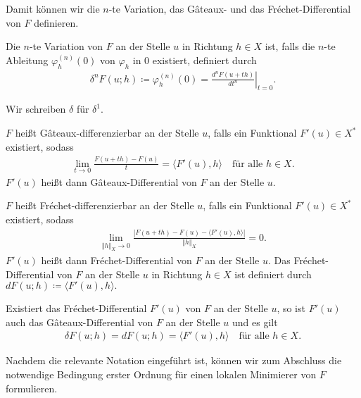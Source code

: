 Damit können wir die $n$-te Variation, das G\^ateaux- und das 
Fr\'echet-Differential von $F$ definieren.

\begin{definition}[$n$-te Variation]
  Die $n$-te Variation von $F$ an der Stelle $u$ in Richtung $h\in X$ ist,
  falls die $n$-te Ableitung $\varphi_h^{(n)}(0)$ von $\varphi_h$ in $0$
  existiert, definiert durch 
  \begin{align*}
    \delta^n F(u;h)\coloneqq \varphi_h^{(n)}(0)=
    \left. \frac{d^n F(u+th)}{dt^n}\right|_{t=0}.
  \end{align*}

  Wir schreiben $\delta$ für $\delta^1$.
\end{definition}

\begin{definition}
  $F$ heißt G\^ateaux-differenzierbar an der Stelle $u$, falls ein 
  Funktional $F'(u)\in X^\ast$ existiert, sodass
  \begin{align*}
    \lim_{t\to 0}\frac{F(u+th)-F(u)}{t} = \langle F'(u), h\rangle\quad
    \text{für alle } h\in X.
  \end{align*}
  $F'(u)$ heißt dann G\^ateaux-Differential von $F$ an der Stelle $u$.

  $F$ heißt Fr\'echet-differenzierbar an der Stelle $u$, falls ein Funktional
  $F'(u)\in X^\ast$ existiert, sodass
  \begin{align*}
    \lim_{\Vert h\Vert_X\to 0}\frac{|F(u+th)-F(u)-
    \langle F'(u),h\rangle|}{\Vert h\Vert_X} =0.
  \end{align*}
  $F'(u)$ heißt dann Fr\'echet-Differential von $F$ an der Stelle $u$.
  Das Fr\'echet-Differential von $F$ an der Stelle $u$ in Richtung $h\in X$
  ist definiert durch $dF(u;h)\coloneqq \langle F'(u),h\rangle.$
\end{definition}

\begin{remark}
  Existiert das Fr\'echet-Differential $F'(u)$ von $F$ an der Stelle
    $u$, so ist $F'(u)$ auch das G\^ateaux-Differential von $F$ an der Stelle
    $u$ und es gilt 
    \begin{align*}
      \delta F(u;h)=dF(u;h)=\langle F'(u),h\rangle\quad\text{für alle } h\in X.
    \end{align*}
\end{remark}

Nachdem die relevante Notation eingeführt ist, können wir zum Abschluss
die notwendige Bedingung erster Ordnung für einen lokalen Minimierer von $F$
formulieren.

